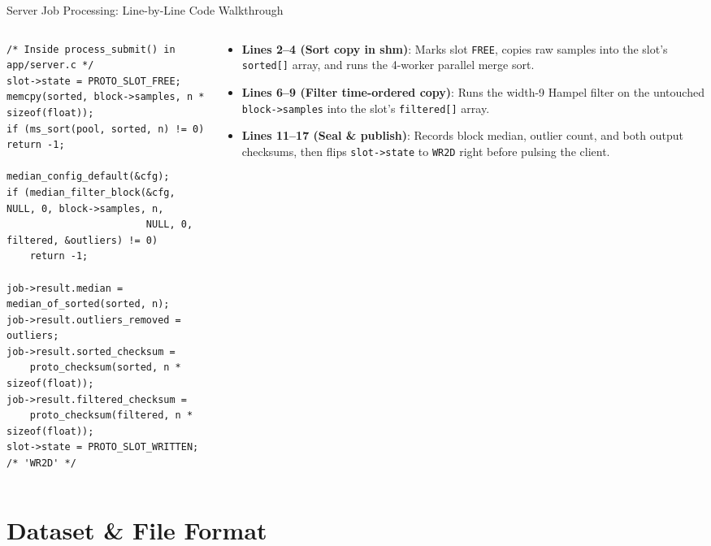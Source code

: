 \begin{frame}[fragile]{Server Job Processing: Line-by-Line Code Walkthrough}
  \begin{columns}[t, onlytextwidth]
    \begin{column}{0.53\textwidth}
\begin{lstlisting}
/* Inside process_submit() in app/server.c */
slot->state = PROTO_SLOT_FREE;
memcpy(sorted, block->samples, n * sizeof(float));
if (ms_sort(pool, sorted, n) != 0) return -1;

median_config_default(&cfg);
if (median_filter_block(&cfg, NULL, 0, block->samples, n,
                        NULL, 0, filtered, &outliers) != 0)
    return -1;

job->result.median = median_of_sorted(sorted, n);
job->result.outliers_removed = outliers;
job->result.sorted_checksum =
    proto_checksum(sorted, n * sizeof(float));
job->result.filtered_checksum =
    proto_checksum(filtered, n * sizeof(float));
slot->state = PROTO_SLOT_WRITTEN; /* 'WR2D' */
\end{lstlisting}
    \end{column}
    \begin{column}{0.44\textwidth}
      \smalltext\compactitem
      \begin{itemize}
        \item \textbf{Lines 2--4 (Sort copy in shm)}: Marks slot \texttt{FREE}, copies raw samples into the slot's \texttt{sorted[]} array, and runs the 4-worker parallel merge sort.
        \item \textbf{Lines 6--9 (Filter time-ordered copy)}: Runs the width-9 Hampel filter on the untouched \texttt{block->samples} into the slot's \texttt{filtered[]} array.
        \item \textbf{Lines 11--17 (Seal \& publish)}: Records block median, outlier count, and both output checksums, then flips \texttt{slot->state} to \texttt{WR2D} right before pulsing the client.
      \end{itemize}
    \end{column}
  \end{columns}
\end{frame}

\section{Dataset \& File Format}


